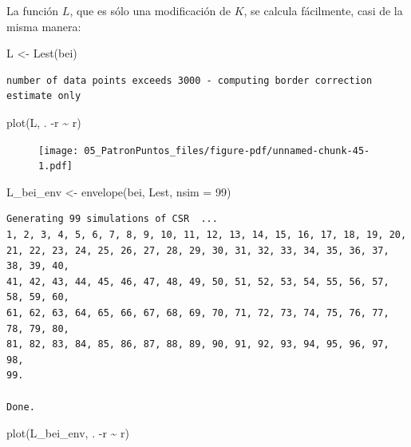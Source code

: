 \documentclass[
  letterpaper,
  DIV=11,
  numbers=noendperiod]{scrreprt}
\newenvironment{Shaded}{\begin{snugshade}}{\end{snugshade}}
\newcommand{\AttributeTok}[1]{\textcolor[rgb]{0.40,0.45,0.13}{#1}}
\newcommand{\DecValTok}[1]{\textcolor[rgb]{0.68,0.00,0.00}{#1}}
\newcommand{\FunctionTok}[1]{\textcolor[rgb]{0.28,0.35,0.67}{#1}}
\newcommand{\NormalTok}[1]{\textcolor[rgb]{0.00,0.23,0.31}{#1}}
\newcommand{\OtherTok}[1]{\textcolor[rgb]{0.00,0.23,0.31}{#1}}
\newcommand{\SpecialCharTok}[1]{\textcolor[rgb]{0.37,0.37,0.37}{#1}}
\begin{document}
La función \(L\), que es sólo una modificación de \(K\), se calcula
fácilmente, casi de la misma manera:

\begin{Shaded}
\begin{Highlighting}[]
\NormalTok{L }\OtherTok{\textless{}{-}} \FunctionTok{Lest}\NormalTok{(bei)}
\end{Highlighting}
\end{Shaded}

\begin{verbatim}
number of data points exceeds 3000 - computing border correction estimate only
\end{verbatim}

\begin{Shaded}
\begin{Highlighting}[]
\FunctionTok{plot}\NormalTok{(L, . }\SpecialCharTok{{-}}\NormalTok{r }\SpecialCharTok{\textasciitilde{}}\NormalTok{ r)}
\end{Highlighting}
\end{Shaded}

\begin{figure}[H]

{\centering \texttt{[image: 05\_PatronPuntos\_files/figure-pdf/unnamed-chunk-45-1.pdf]}

}

\end{figure}

\begin{Shaded}
\begin{Highlighting}[]
\NormalTok{L\_bei\_env }\OtherTok{\textless{}{-}} \FunctionTok{envelope}\NormalTok{(bei, Lest, }\AttributeTok{nsim =} \DecValTok{99}\NormalTok{)}
\end{Highlighting}
\end{Shaded}

\begin{verbatim}
Generating 99 simulations of CSR  ...
1, 2, 3, 4, 5, 6, 7, 8, 9, 10, 11, 12, 13, 14, 15, 16, 17, 18, 19, 20,
21, 22, 23, 24, 25, 26, 27, 28, 29, 30, 31, 32, 33, 34, 35, 36, 37, 38, 39, 40,
41, 42, 43, 44, 45, 46, 47, 48, 49, 50, 51, 52, 53, 54, 55, 56, 57, 58, 59, 60,
61, 62, 63, 64, 65, 66, 67, 68, 69, 70, 71, 72, 73, 74, 75, 76, 77, 78, 79, 80,
81, 82, 83, 84, 85, 86, 87, 88, 89, 90, 91, 92, 93, 94, 95, 96, 97, 98, 
99.

Done.
\end{verbatim}

\begin{Shaded}
\begin{Highlighting}[]
\FunctionTok{plot}\NormalTok{(L\_bei\_env, . }\SpecialCharTok{{-}}\NormalTok{r }\SpecialCharTok{\textasciitilde{}}\NormalTok{ r)}
\end{Highlighting}
\end{Shaded}
\end{document}
